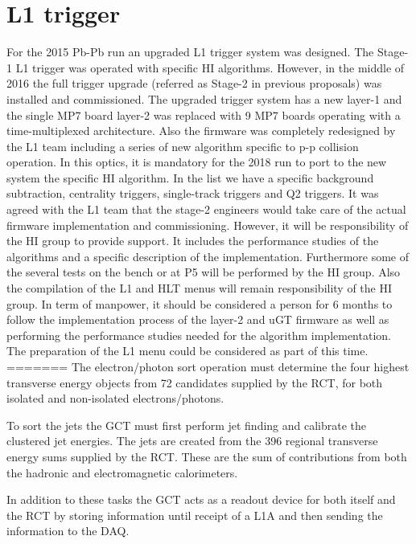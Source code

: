 \section{L1 trigger\label{sec:L1Trigger}}
For the 2015 Pb-Pb run an upgraded L1 trigger system was designed. The Stage-1 L1 trigger was operated with specific HI
algorithms. However, in the middle of 2016 the full trigger upgrade (referred as Stage-2 in previous proposals) was
installed and commissioned. The upgraded trigger system has a new layer-1 and the single MP7 board layer-2 was replaced
with 9 MP7 boards operating with a time-multiplexed architecture. Also the firmware was completely redesigned by the L1
team including a series of new algorithm specific to p-p collision operation. In this optics, it is mandatory for the
2018 run to port to the new system the specific HI algorithm. In the list we have a specific background subtraction,
centrality triggers, single-track triggers and Q2 triggers. It was agreed with the L1 team that the stage-2 engineers
would take care of the actual firmware implementation and commissioning. However, it will be responsibility of the HI
group to provide support. It includes the performance studies of the algorithms and a specific description of the
implementation. Furthermore some of the several tests on the bench or at P5 will be performed by the HI group. Also the
compilation of the L1 and HLT menus will remain responsibility of the HI group. In term of manpower, it should be
considered a person for 6 months to follow the implementation process of the layer-2 and uGT firmware as well as
performing the performance studies needed for the algorithm implementation. The preparation of the L1 menu could be
considered as part of this time. 
=======
The electron/photon sort operation must determine the four highest transverse energy objects from 72 candidates supplied by the RCT, 
for both isolated and non-isolated electrons/photons.

To sort the jets the GCT must first perform jet finding and calibrate the clustered jet energies. The jets are created from the 396 
regional transverse energy sums supplied by the RCT. These are the sum of contributions from both the hadronic and electromagnetic 
calorimeters.

In addition to these tasks the GCT acts as a readout device for both itself and the RCT by storing information until receipt of a L1A 
and then sending the information to the DAQ.



